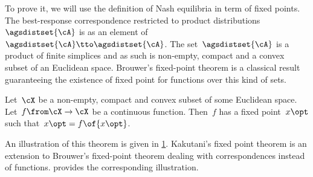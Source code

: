 To prove it, we will use the definition of Nash equilibria in term of fixed points.
The best-response correspondence restricted to product distributions~\(\agsdistset{\cA}\) is as an element of~\(\agsdistset{\cA} \tto \agsdistset{\cA}\).
The set~\(\agsdistset{\cA}\) is a product of finite simplices and as such is non-empty, compact and a convex subset of an Euclidean space.
Brouwer's fixed-point theorem is a classical result guaranteeing the existence of fixed point for functions over this kind of sets.

\begin{theorem}
Let~\(\cX\) be a non-empty, compact and convex subset of some Euclidean space.
Let~\(f \from \cX \to \cX\) be a continuous function.
Then~\(f\) has a fixed point~\(x\opt\) such that~\(x\opt = f \of {x\opt}\).
\end{theorem}

An illustration of this theorem is given in \cref{fig:brouwer_fixed_point}.
Kakutani's fixed point theorem is an extension to Brouwer's fixed-point theorem dealing with correspondences instead of functions.
 provides the corresponding illustration.

\begin{figure}[th]
\centering
{}
\label{fig:brouwer_fixed_point}
\end{figure}

\begin{figure}[th]
\centering
{}
\label{fig:kakutani_fixed_point}
\end{figure}

